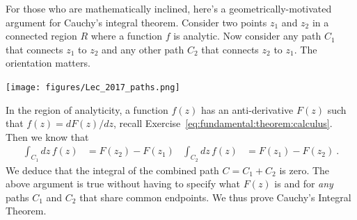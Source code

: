 
For those who are mathematically inclined, here's a geometrically-motivated argument for Cauchy's integral theorem. Consider two points $z_1$ and $z_2$ in a connected region $R$ where a function $f$ is analytic. Now consider any path $C_1$ that connects $z_1$ to $z_2$ and any other path $C_2$ that connects $z_2$ to $z_1$. The orientation matters.
\begin{center}
\texttt{[image: figures/Lec\_2017\_paths.png]}
\end{center}
In the region of analyticity, a function $f(z)$ has an anti-derivative $F(z)$ such that $f(z) = dF(z)/dz$, recall Exercise~\ref{eq:fundamental:theorem:calculus}. Then we know that
\begin{align}
	\int_{C_1} dz\, f(z) &= F(z_2) - F(z_1)
	&
	\int_{C_2} dz\, f(z) &= F(z_1) - F(z_2) \ .
\end{align}
We deduce that the integral of the combined path $C=C_1+C_2$ is zero. The above argument is true without having to specify what $F(z)$ is and for \emph{any} paths $C_1$ and $C_2$ that share common endpoints. We thus prove Cauchy's Integral Theorem.

